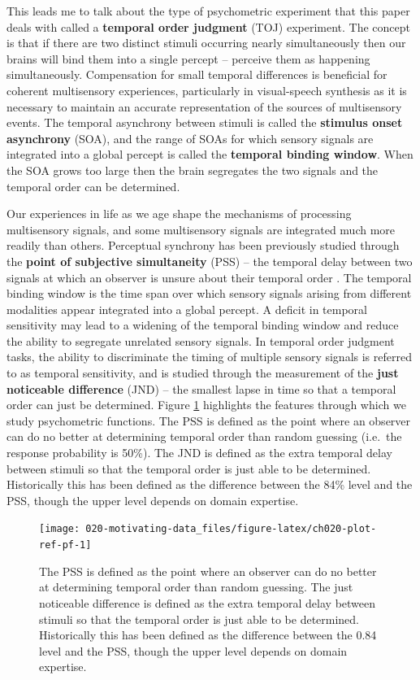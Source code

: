 \documentclass[11pt, oneside, openany]{scrbook}
\begin{document}
This leads me to talk about the type of psychometric experiment that this paper deals with called a \textbf{temporal order judgment} (TOJ) experiment. The concept is that if there are two distinct stimuli occurring nearly simultaneously then our brains will bind them into a single percept -- perceive them as happening simultaneously. Compensation for small temporal differences is beneficial for coherent multisensory experiences, particularly in visual-speech synthesis as it is necessary to maintain an accurate representation of the sources of multisensory events. The temporal asynchrony between stimuli is called the \textbf{stimulus onset asynchrony} (SOA), and the range of SOAs for which sensory signals are integrated into a global percept is called the \textbf{temporal binding window}. When the SOA grows too large then the brain segregates the two signals and the temporal order can be determined.

Our experiences in life as we age shape the mechanisms of processing multisensory signals, and some multisensory signals are integrated much more readily than others. Perceptual synchrony has been previously studied through the \textbf{point of subjective simultaneity} (PSS) -- the temporal delay between two signals at which an observer is unsure about their temporal order \citep{stone2001now}. The temporal binding window is the time span over which sensory signals arising from different modalities appear integrated into a global percept. A deficit in temporal sensitivity may lead to a widening of the temporal binding window and reduce the ability to segregate unrelated sensory signals. In temporal order judgment tasks, the ability to discriminate the timing of multiple sensory signals is referred to as temporal sensitivity, and is studied through the measurement of the \textbf{just noticeable difference} (JND) -- the smallest lapse in time so that a temporal order can just be determined. Figure \ref{fig:ch020-plot-ref-pf} highlights the features through which we study psychometric functions. The PSS is defined as the point where an observer can do no better at determining temporal order than random guessing (i.e.~the response probability is 50\%). The JND is defined as the extra temporal delay between stimuli so that the temporal order is just able to be determined. Historically this has been defined as the difference between the 84\% level and the PSS, though the upper level depends on domain expertise.

\begin{figure}

{\centering \texttt{[image: 020-motivating-data\_files/figure-latex/ch020-plot-ref-pf-1]} 

}

\caption{The PSS is defined as the point where an observer can do no better at determining temporal order than random guessing. The just noticeable difference is defined as the extra temporal delay between stimuli so that the temporal order is just able to be determined. Historically this has been defined as the difference between the 0.84 level and the PSS, though the upper level depends on domain expertise.}\label{fig:ch020-plot-ref-pf}
\end{figure}
\end{document}
